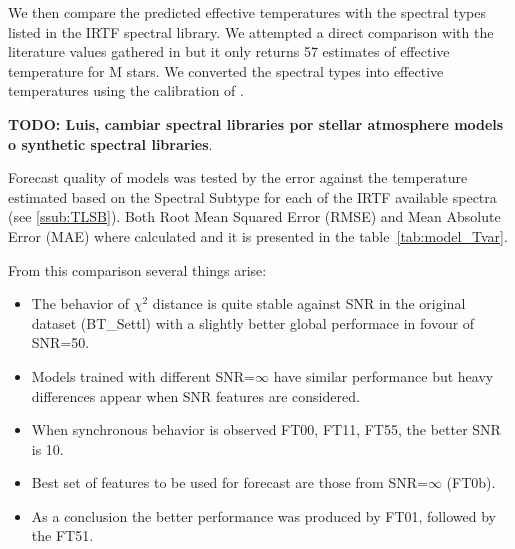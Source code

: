 


We then compare the predicted effective temperatures with the spectral
types listed in the IRTF spectral library. We attempted a direct
comparison with the literature values gathered in \cite{cesetti} but
it only returns 57 
estimates of effective temperature for M stars. We converted the
spectral types into effective temperatures using the calibration
of \cite{2009ApJ...702..154S}.

{\bf TODO: Luis, cambiar spectral libraries por stellar atmosphere
models o synthetic spectral libraries}.

Forecast quality of models was tested by the error against the
temperature estimated based on the Spectral Subtype for each of the
IRTF available spectra (see \ref{ssub:TLSB}).  Both Root Mean Squared
Error (RMSE) and Mean Absolute Error (MAE) where calculated and it is
presented in the table~\ref{tab:model_Tvar}.

From this comparison several things arise:
\begin{itemize}
 \item {The behavior of $\chi^2$ distance is quite stable against SNR 
	in the original dataset (BT\_Settl) with a slightly better global 
	performace in fovour of SNR=50.}
 \item {Models trained with different SNR=$\infty$ have similar performance but heavy 
	differences appear when SNR features are considered.}
 \item {When synchronous behavior is observed FT00, FT11, FT55, the better SNR is 10.}
 \item {Best set of features to be used for forecast are those from SNR=$\infty$ (FT0b).}
 \item {As a conclusion the better performance was produced by FT01, followed by the FT51.}
\end{itemize}

